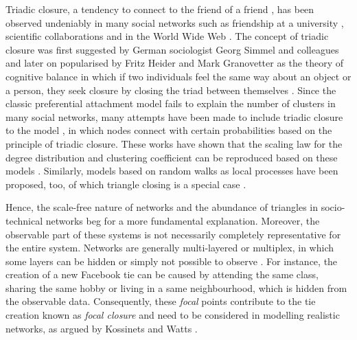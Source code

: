 \documentclass{jimis-final-en}
\begin{document}
Triadic closure, a tendency to connect to the friend of a friend
\citep{rapoport1953spread}, has been observed undeniably in many social
networks such as friendship at a university
\citep{kossinets2006empirical}, scientific collaborations
\citep{newman2001clustering} and in the World Wide Web
\citep{adamic1999small}. The concept of triadic closure was first
suggested by German sociologist Georg Simmel and colleagues
\citeyearpar{simmel1950sociology} and later on popularised by Fritz Heider
and Mark Granovetter as the theory of cognitive balance in which if two
individuals feel the same way about an object or a person, they seek
closure by closing the triad between themselves
\citep{heider2013psychology}.  
Since the classic preferential attachment model fails to explain the
number of clusters in many social networks, many attempts have been made
to include triadic closure to the model
\citep{holme2002growing,vazquez2003growing}, in 
which nodes connect with certain probabilities based on the principle of
triadic closure.  These works have shown that the scaling law for the
degree distribution and clustering coefficient can be reproduced based
on these models \citep{klimek2013triadic}.
Similarly, models based on random walks as local processes have been
proposed, too, of which triangle closing is a special case
\citep{evans2005}. 

Hence, the scale-free nature of networks and the abundance of
triangles in socio-technical networks beg for
a more fundamental explanation.  Moreover, the observable part of these
systems is not necessarily completely representative for the entire
system.  Networks are generally multi-layered or multiplex, in which some
layers can be hidden or simply not possible to observe
\citep{kivela2014multilayer}.  For instance, the creation of a new Facebook tie
can be caused by attending the same class, sharing the same hobby or
living in a same neighbourhood,  which is hidden from the observable
data.  Consequently, these \emph{focal} points contribute to the tie
creation known as \emph{focal closure} and need to be considered in
modelling realistic networks, as argued by Kossinets and Watts
\citeyearpar{kossinets2006empirical}.  

\end{document}
